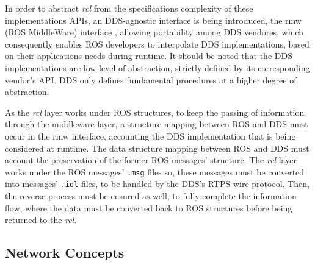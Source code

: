 In order to abstract \textit{rcl} from the specifications complexity of these implementations APIs, an DDS-agnostic interface is being introduced, the rmw (ROS MiddleWare) interface \cite{casini2019response}, allowing portability among DDS vendores, which consequently enables ROS developers to interpolate DDS implementations, based on their applications needs during runtime. It should be noted that the DDS implementations are low-level of abstraction, strictly defined by its corresponding vendor's API. DDS only defines fundamental procedures at a higher degree of abstraction.  


As the \textit{rcl} layer works under ROS structures, to keep the passing of information through the middleware layer, a structure mapping between ROS and DDS must occur in the rmw interface, accounting the DDS implementation that is being considered at runtime. \cite{casini2019response} The data structure mapping between ROS and DDS must account the preservation of the former ROS messages' structure. The \textit{rcl} layer works under the ROS messages' \texttt{.msg} files so, these messages must be converted into messages' \texttt{.idl} files, to be handled by the DDS's RTPS wire protocol. \cite{ros-on-dds} Then, the reverse process must be ensured as well, to fully complete the information flow, where the data must be converted back to ROS structures before being returned to the \textit{rcl}.


\subsection{Network Concepts}


